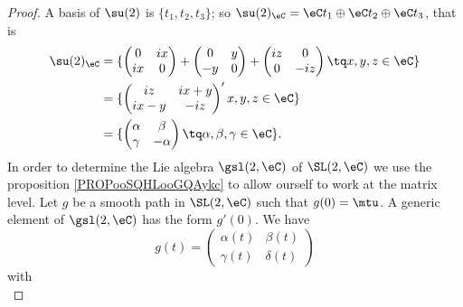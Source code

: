 \begin{proof}
	A basis of \( \su(2)\) is \( \{ t_1,t_2,t_3 \}\); so \( \su(2)_{\eC}=\eC t_1\oplus \eC t_2\oplus \eC t_3\), that is
	\begin{subequations}
		\begin{align}
			\su(2)_\eC & =\{ \begin{pmatrix}
				                 0  & ix \\
				                 ix & 0
			                 \end{pmatrix}+\begin{pmatrix}
				                               0  & y \\
				                               -y & 0
			                               \end{pmatrix}+\begin{pmatrix}
				                                             iz & 0   \\
				                                             0  & -iz
			                                             \end{pmatrix}\tq x,y,z\in \eC\} \\
			           & =\{\begin{pmatrix}
				                iz   & ix+y \\
				                ix-y & -iz
			                \end{pmatrix}\rq x,y,z\in \eC\}                              \\
			           & =\{\begin{pmatrix}
				                \alpha & \beta   \\
				                \gamma & -\alpha
			                \end{pmatrix}\tq \alpha,\beta,\gamma\in \eC\}.
		\end{align}
	\end{subequations}
	In order to determine the Lie algebra \( \gsl(2,\eC)\) of \( \SL(2,\eC)\) we use the proposition \ref{PROPooSQHLooGQAykc} to allow ourself to work at the matrix level. Let \( g\) be a smooth path in \( \SL(2,\eC)\) such that \( g(0)=\mtu\). A generic element of \( \gsl(2,\eC)\) has the form \( g'(0)\). We have
	\begin{equation}
		g(t)=\begin{pmatrix}
			\alpha(t) & \beta(t)  \\
			\gamma(t) & \delta(t)
		\end{pmatrix}
	\end{equation}
	with
	\begin{equation}        \label{EQooMNXMooVkbfDg}

\end{equation}
\end{proof}
